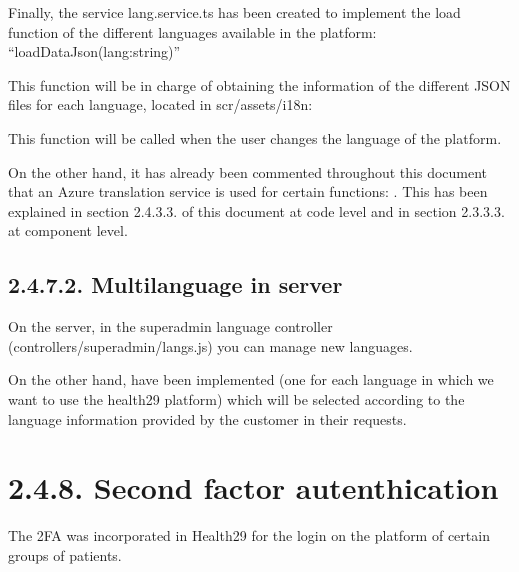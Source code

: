 \documentclass[letterpaper,10pt,english]{sphinxmanual}
\begin{document}
\begin{sphinxVerbatim}[commandchars=\\\{\}]
\end{sphinxVerbatim}

Finally, the service lang.service.ts has been created to implement the load function of the different languages available in the platform: “loadDataJson(lang:string)”

\begin{sphinxVerbatim}[commandchars=\\\{\}]
\end{sphinxVerbatim}

This function will be in charge of obtaining the information of the different JSON files for each language, located in scr/assets/i18n:



This function will be called when the user changes the language of the platform.

On the other hand, it has already been commented throughout this document that an Azure translation service is used for certain functions: . This has been explained in section 2.4.3.3. of this document at code level and in section 2.3.3.3. at component level.


\subsection{2.4.7.2. Multilanguage in server}
\label{\detokenize{pages/SW/Code:multilanguage-in-server}}
On the server, in the superadmin language controller (controllers/superadmin/langs.js) you can manage new languages.

On the other hand,  have been implemented (one for each language in which we want to use the health29 platform) which will be selected according to the language information provided by the customer in their requests.


\section{2.4.8. Second factor autenthication}
\label{\detokenize{pages/SW/Code:second-factor-autenthication}}
The 2FA was incorporated in Health29 for the login on the platform of certain groups of patients.
\end{document}
